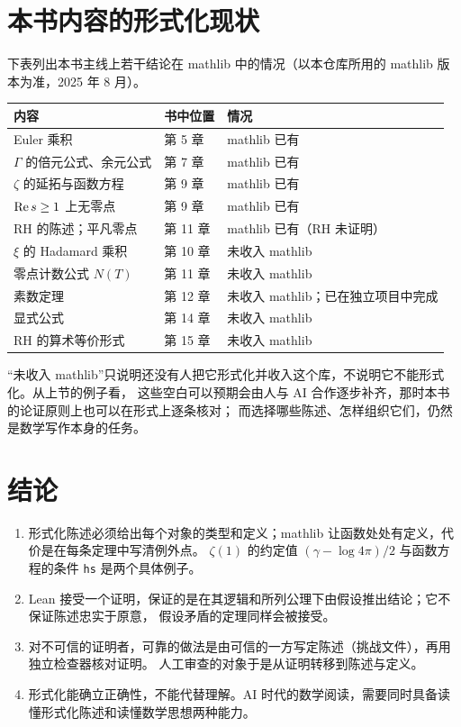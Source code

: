 \documentclass[11pt]{article}
\begin{document}
\section{本书内容的形式化现状}
下表列出本书主线上若干结论在 mathlib 中的情况（以本仓库所用的 mathlib 版本为准，2025 年 8 月）。

\begin{center}\small
\begin{tabular}{@{}lll@{}}
\toprule
内容 & 书中位置 & 情况 \\
\midrule
Euler 乘积 & 第 5 章 & mathlib 已有 \\
$\Gamma$ 的倍元公式、余元公式 & 第 7 章 & mathlib 已有 \\
$\zeta$ 的延拓与函数方程 & 第 9 章 & mathlib 已有 \\
$\operatorname{Re} s\ge1$ 上无零点 & 第 9 章 & mathlib 已有 \\
RH 的陈述；平凡零点 & 第 11 章 & mathlib 已有（RH 未证明） \\
$\xi$ 的 Hadamard 乘积 & 第 10 章 & 未收入 mathlib \\
零点计数公式 $N(T)$ & 第 11 章 & 未收入 mathlib \\
素数定理 & 第 12 章 & 未收入 mathlib；已在独立项目中完成 \\
显式公式 & 第 14 章 & 未收入 mathlib \\
RH 的算术等价形式 & 第 15 章 & 未收入 mathlib \\
\bottomrule
\end{tabular}
\end{center}

“未收入 mathlib”只说明还没有人把它形式化并收入这个库，不说明它不能形式化。从上节的例子看，
这些空白可以预期会由人与 AI 合作逐步补齐，那时本书的论证原则上也可以在形式上逐条核对；
而选择哪些陈述、怎样组织它们，仍然是数学写作本身的任务。

\section{结论}
\begin{enumerate}
 \item 形式化陈述必须给出每个对象的类型和定义；mathlib 让函数处处有定义，代价是在每条定理中写清例外点。
 $\zeta(1)$ 的约定值 $(\gamma-\log4\pi)/2$ 与函数方程的条件 \texttt{hs} 是两个具体例子。
 \item Lean 接受一个证明，保证的是在其逻辑和所列公理下由假设推出结论；它不保证陈述忠实于原意，
 假设矛盾的定理同样会被接受。
 \item 对不可信的证明者，可靠的做法是由可信的一方写定陈述（挑战文件），再用独立检查器核对证明。
 人工审查的对象于是从证明转移到陈述与定义。
 \item 形式化能确立正确性，不能代替理解。AI 时代的数学阅读，需要同时具备读懂形式化陈述和读懂数学思想两种能力。
\end{enumerate}
\end{document}
